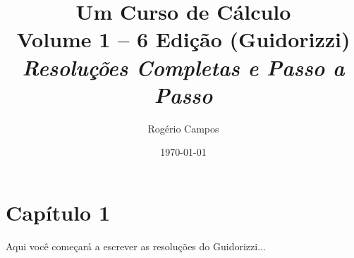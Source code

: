 \documentclass[12pt,a4paper]{article}
\title{
    \Huge \textbf{Um Curso de Cálculo} \\
    \vspace{0.3cm}
    \Large Volume 1 -- 6\textordfeminine{} Edição (Guidorizzi) \\
    \vspace{0.5cm}
    \large \textit{Resoluções Completas e Passo a Passo}
}
\author{Rogério Campos}
\date{\today}
\begin{document}
\maketitle

\newpage

\section*{Capítulo 1}
Aqui você começará a escrever as resoluções do Guidorizzi...
\end{document}
